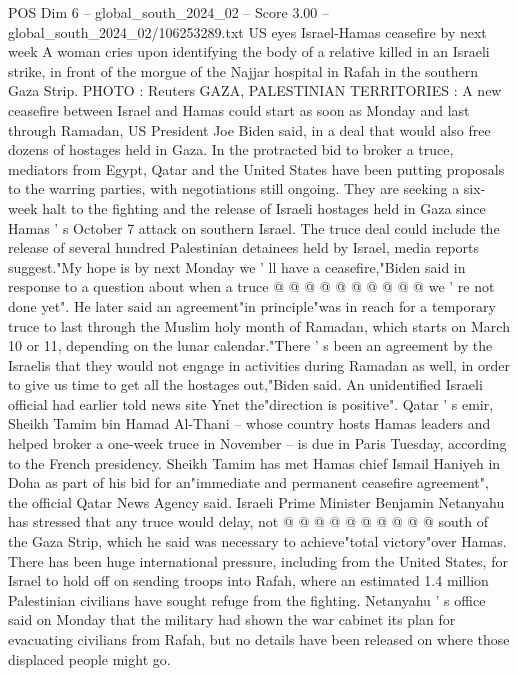 \begin{textsample}{POS Dim 6 – global\_south\_2024\_02 – Score 3.00 – global\_south\_2024\_02/106253289.txt}  \label{ex:f6_pos_170}
US eyes Israel-Hamas ceasefire by next week A woman cries upon identifying the body of a relative killed in an Israeli strike, in front of the morgue of the Najjar hospital in Rafah in the southern Gaza Strip.
PHOTO : Reuters GAZA, PALESTINIAN TERRITORIES : A new ceasefire between Israel and Hamas could start as soon as Monday and last through Ramadan, US President Joe Biden said, in a deal that would also free dozens of hostages held in Gaza.
In the protracted bid to broker a truce, mediators from Egypt, Qatar and the United States have been putting proposals to the warring parties, with negotiations still ongoing.
They are seeking a six-week halt to the fighting and the release of Israeli hostages held in Gaza since Hamas ' s October 7 attack on southern Israel.
The truce deal could include the release of several hundred Palestinian detainees held by Israel, media reports suggest."My hope is by next Monday we ' ll have a ceasefire,"Biden said in response to a question about when a truce @ @ @ @ @ @ @ @ @ @ we ' re not done yet".
He later said an agreement"in principle"was in reach for a temporary truce to last through the Muslim holy month of Ramadan, which starts on March 10 or 11, depending on the lunar calendar."There ' s been an agreement by the Israelis that they would not engage in activities during Ramadan as well, in order to give us time to get all the hostages out,"Biden said.
An unidentified Israeli official had earlier told news site Ynet the"direction is positive".
Qatar ' s emir, Sheikh Tamim bin Hamad Al-Thani -- whose country hosts Hamas leaders and helped broker a one-week truce in November -- is due in Paris Tuesday, according to the French presidency.
Sheikh Tamim has met Hamas chief Ismail Haniyeh in Doha as part of his bid for an"immediate and permanent ceasefire agreement", the official Qatar News Agency said.
Israeli Prime Minister Benjamin Netanyahu has stressed that any truce would delay, not @ @ @ @ @ @ @ @ @ @ south of the Gaza Strip, which he said was necessary to achieve"total victory"over Hamas.
There has been huge international pressure, including from the United States, for Israel to hold off on sending troops into Rafah, where an estimated 1.4 million Palestinian civilians have sought refuge from the fighting.
Netanyahu ' s office said on Monday that the military had shown the war cabinet its plan for evacuating civilians from Rafah, but no details have been released on where those displaced people might go.

\end{textsample}
